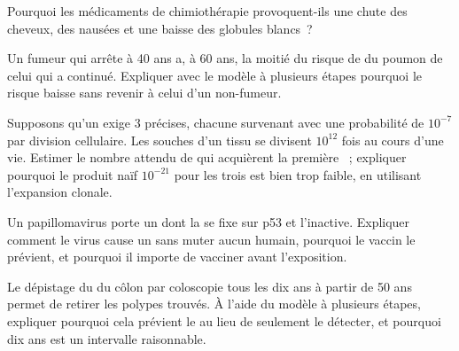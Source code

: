 \begin{exercise}[$\star\star$]\label{exo:g11:cancer:10}
Pourquoi les médicaments de chimiothérapie provoquent-ils une chute des
cheveux, des nausées et une baisse des globules blancs~?
\end{exercise}

\begin{exercise}[$\star\star$]\label{exo:g11:cancer:11}
Un fumeur qui arrête à 40 ans a, à 60 ans, la moitié du risque de
 du poumon de celui qui a continué. Expliquer avec le modèle à
plusieurs étapes pourquoi le risque baisse sans revenir à celui d'un
non-fumeur.
\end{exercise}

\begin{exercise}[$\star\star\star$]\label{exo:g11:cancer:12}
Supposons qu'un  exige 3  précises, chacune survenant
avec une probabilité de $10^{-7}$ par division cellulaire. Les 
souches d'un tissu se divisent $10^{12}$ fois au cours d'une vie.
Estimer le nombre attendu de  qui acquièrent la première
~; expliquer pourquoi le produit naïf $10^{-21}$ pour les trois
est bien trop faible, en utilisant l'expansion clonale.
\end{exercise}

\begin{exercise}[$\star\star\star$]\label{exo:g11:cancer:13}
Un papillomavirus porte un  dont la  se fixe sur p53 et
l'inactive. Expliquer comment le virus cause un  sans muter aucun
 humain, pourquoi le vaccin le prévient, et pourquoi il importe de
vacciner avant l'exposition.
\end{exercise}

\begin{exercise}[$\star\star\star$]\label{exo:g11:cancer:14}
Le dépistage du  du côlon par coloscopie tous les dix ans à
partir de 50 ans permet de retirer les polypes trouvés. À l'aide du
modèle à plusieurs étapes, expliquer pourquoi cela prévient le 
au lieu de seulement le détecter, et pourquoi dix ans est un intervalle
raisonnable.
\end{exercise}

